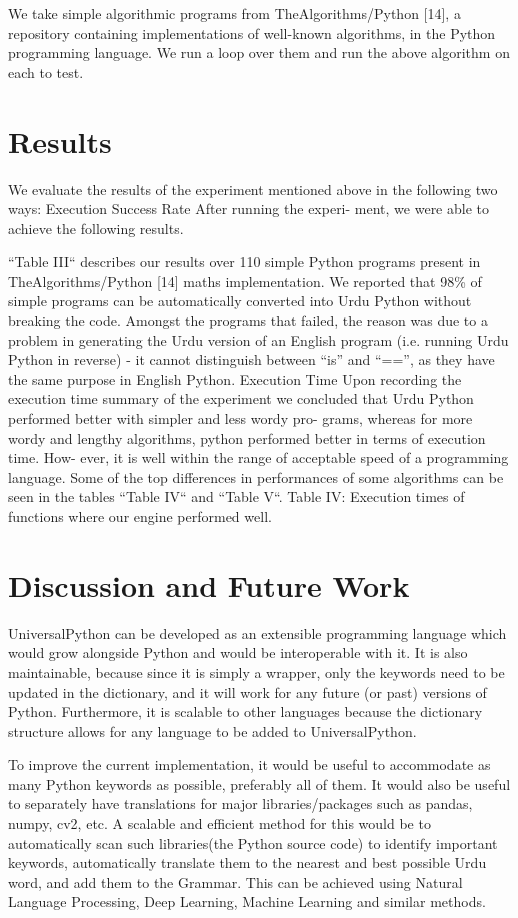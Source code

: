 \documentclass[conference]{IEEEtran}
\begin{document}
We take simple algorithmic programs from TheAlgorithms/Python [14], a repository containing implementations of well-known algorithms, in the Python programming language. We run a loop over them and run the above algorithm on each to test.

\section{Results}

We evaluate the results of the experiment mentioned above in the following two ways:
Execution Success Rate After running the experi- ment, we were able to achieve the following results.

“Table III“ describes our results over 110 simple Python programs present in TheAlgorithms/Python [14] maths implementation.
We reported that 98\% of simple programs can be automatically converted into Urdu Python without breaking the code. Amongst the programs that failed, the reason was due to a problem in generating the Urdu version of an English program (i.e. running Urdu Python in reverse) - it cannot distinguish between “is” and “==”, as they have the same purpose in English Python.
Execution Time Upon recording the execution time summary of the experiment we concluded that Urdu Python performed better with simpler and less wordy pro- grams, whereas for more wordy and lengthy algorithms, python performed better in terms of execution time. How- ever, it is well within the range of acceptable speed of a programming language. Some of the top differences in performances of some algorithms can be seen in the tables “Table IV“ and “Table V“.
Table IV: Execution times of functions where our engine performed well.

\section{Discussion and Future Work}

UniversalPython can be developed as an extensible programming language which would grow alongside Python and would be interoperable with it. It is also maintainable, because since it is simply a wrapper, only the keywords need to be updated in the dictionary, and it will work for any future (or past) versions of Python. Furthermore, it is scalable to other languages because the dictionary structure allows for any language to be added to UniversalPython.

To improve the current implementation, it would be useful to accommodate as many Python keywords as possible, preferably all of them. It would also be useful to separately have translations for major libraries/packages such as pandas, numpy, cv2, etc. A scalable and eﬀicient method for this would be to automatically scan such libraries(the Python source code) to identify important keywords, automatically translate them to the nearest and best possible Urdu word, and add them to the Grammar. This can be achieved using Natural Language Processing, Deep Learning, Machine Learning and similar methods.
\end{document}
